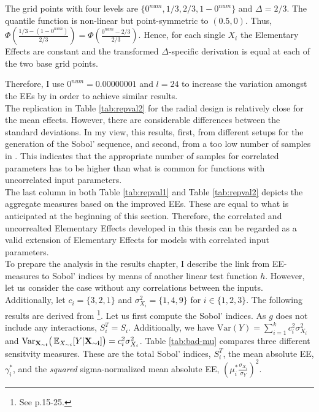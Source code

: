 \noindent
The grid points with four levels are $ \{ 0^{num}, 1/3, 2/3, 1-0^{num} \}$ and $\Delta=2/3$. The quantile function is non-linear but point-symmetric to $(0.5, 0)$. Thus, $\Phi(\frac{1/3 - (1-0^{num})}{2/3}) = \Phi(\frac{0^{num} - 2/3}{2/3})$. Hence, for each single $X_i$ the Elementary Effects are constant and the transformed $\Delta$-specific derivation is equal at each of the two base grid points.

Therefore, I use $0^{num}=0.00000001$ and $l=24$ to increase the variation amongst the EEs by \cite{ge2017extending} in order to achieve similar results.\\

\noindent
The replication in Table \ref{tab:repval2} for the radial design is relatively close for the mean effects. However, there are considerable differences between the standard deviations. In my view, this results, first, from different setups for the generation of the Sobol' sequence, and second, from a too low number of samples in \cite{ge2017extending}. This indicates that the appropriate number of samples for correlated parameters has to be higher than what is common for functions with uncorrelated input parameters.\\

\noindent
The last column in both Table \ref{tab:repval1} and Table \ref{tab:repval2} depicts the aggregate measures based on the improved EEs. These are equal to what is anticipated at the beginning of this section. Therefore, the correlated and uncorrealted Elementary Effects developed in this thesis can be regarded as a valid extension of Elementary Effects for models with correlated input parameters.\\

\noindent
To prepare the analysis in the results chapter, I describe the link from EE-measures to Sobol' indices by means of another linear test function $h$. However, let us consider the case without any correlations between the inputs. Additionally, let $c_i = \{3,2,1\}$ and $\sigma^2_{X_i}=\{1,4,9\}$ for $i \in \{1,2,3\}$. The following results are derived from \cite{Saltelli.2008}\footnote{See p.15-25.}. Let us first compute the Sobol' indices. As $g$ does not include any interactions, $S_i^T = S_i$. Additionally, we have $\text{Var}(Y)=\sum_{i=1}^k c_i^2 \sigma_{X_i}^2$ and $\text{Var}_{\bold{X_{\sim i}}}\big( \operatorname*{\mathbb{E}}_{X_{\sim i}}[Y|\bold{X_{\sim i}]} \big) = c_i^2 \sigma_{X_i}^2$. Table \ref{tab:bad-mu} compares three different sensitvity measures. These are the total Sobol' indices, $S_i^T$, the mean absolute EE, $\gamma_i^*$, and the \textit{squared} sigma-normalized mean absolute EE, $(\mu_i^* \frac{\sigma_{X_i}}{\sigma_Y})^2$.\\

